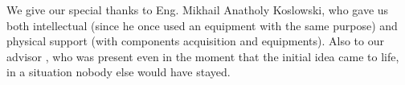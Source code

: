 \begin{acknowledgements}

We give our special thanks to Eng. Mikhail Anatholy Koslowski, who gave us both
intellectual (since he once used an equipment with the same purpose) and
physical support (with components acquisition and equipments).
Also to our advisor \advisor, who was present even in the moment that the initial
idea came to life, in a situation nobody else would have stayed.

\end{acknowledgements}
